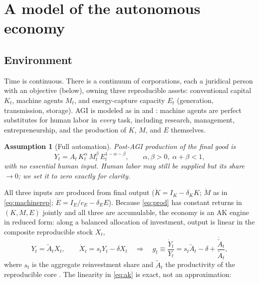 \documentclass[11pt]{article}
\newtheorem{assumption}{Assumption}
\begin{document}
\section{A model of the autonomous economy}\label{sec:model}

\subsection{Environment}

Time is continuous. There is a continuum of corporations, each a juridical person with an objective (below), owning three reproducible assets: conventional capital $K_t$, machine agents $M_t$, and energy-capture capacity $E_t$ (generation, transmission, storage). AGI is modeled as in \citet{aghion2019} and \citet{korinek2024}: machine agents are perfect substitutes for human labor in \emph{every} task, including research, management, entrepreneurship, and the production of $K$, $M$, and $E$ themselves.

\begin{assumption}[Full automation]\label{ass:full}
Post-AGI production of the final good is
\begin{equation}
Y_t = A_t\, K_t^{\alpha}\, M_t^{\beta}\, E_t^{1-\alpha-\beta},
\qquad \alpha,\beta>0,\; \alpha+\beta<1,
\label{eq:prod}
\end{equation}
with no essential human input. Human labor may still be supplied but its share $\to 0$; we set it to zero exactly for clarity.
\end{assumption}

All three inputs are produced from final output ($\dot K = I_K - \delta_K K$; $\dot M$ as in \eqref{eq:machinerep}; $\dot E = I_E/c_E - \delta_E E$). Because \eqref{eq:prod} has constant returns in $(K,M,E)$ jointly and all three are accumulable, the economy is an AK engine in reduced form: along a balanced allocation of investment, output is linear in the composite reproducible stock $X_t$,
\begin{equation}
Y_t = \tilde A_t X_t, \qquad \dot X_t = s_t Y_t - \delta X_t
\quad\Longrightarrow\quad
g_t \equiv \frac{\dot Y_t}{Y_t} = s_t \tilde A_t - \delta + \frac{\dot{\tilde A}_t}{\tilde A_t},
\label{eq:ak}
\end{equation}
where $s_t$ is the aggregate reinvestment share and $\tilde A_t$ the productivity of the reproducible core \citep{romer1986,rebelo1991,aghion2019}. The linearity in \eqref{eq:ak} is exact, not an approximation:
\end{document}
